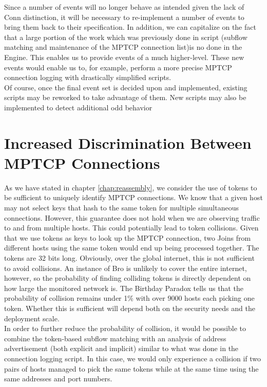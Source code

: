 Since a number of events will no longer behave as intended given the lack of Conn distinction, it will be necessary to re-implement a number of events to bring them back to their specification. In addition, we can capitalize on the fact that a large portion of the work which was previously done in script (subflow matching and maintenance of the MPTCP connection list)is no done in the Engine. This enables us to provide events of a much higher-level. These new events would enable us to, for example, perform a more precise MPTCP connection logging with drastically simplified scripts.\\

Of course, once the final event set is decided upon and implemented, existing scripts may be reworked to take advantage of them. New scripts may also be implemented to detect additional odd behavior

\section{Increased Discrimination Between MPTCP Connections}
As we have stated in chapter \ref{chap:reassembly}, we consider the use of tokens to be sufficient to uniquely identify MPTCP connections. We know that a given host may not select keys that hash to the same token for multiple simultaneous connections. However, this guarantee does not hold when we are observing traffic to and from multiple hosts. This could potentially lead to token collisions. Given that we use tokens as keys to look up the MPTCP connection, two Joins from different hosts using the same token would end up being processed together. The tokens are 32 bits long. Obviously, over the global internet, this is not sufficient to avoid collisions. An instance of Bro is unlikely to cover the entire internet, however, so the probability of finding colliding tokens is directly dependent on how large the monitored network is. The Birthday Paradox tells us that the probability of collision remains under 1\% with over 9000 hosts each picking one token. Whether this is sufficient will depend both on the security needs and the deployment scale. \\

In order to further reduce the probability of collision, it would be possible to combine the token-based subflow matching with an analysis of address advertisement (both explicit and implicit) similar to what was done in the connection logging script. In this case, we would only experience a collision if two pairs of hosts managed to pick the same tokens while at the same time using the same addresses and port numbers. \\

